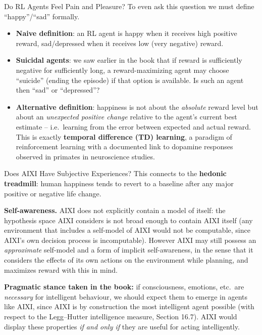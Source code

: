 \documentclass[aspectratio=169,10pt]{beamer}
\begin{document}
\begin{frame}{Do RL Agents Feel Pain and Pleasure?}
  To even ask this question we must define ``happy''/``sad'' formally.
  \begin{itemize}
    \item \textbf{Naive definition}: an RL agent is happy when it receives
      high positive reward, sad/depressed when it receives low
      (very negative) reward.
    \item \textbf{Suicidal agents}: we saw earlier in the book that if
      reward is sufficiently negative for sufficiently long, a
      reward-maximizing agent may choose ``suicide'' (ending the episode)
      if that option is available. Is such an agent then ``sad'' or
      ``depressed''?
    \item \textbf{Alternative definition}: happiness is not about the
      \emph{absolute} reward level but about an \emph{unexpected positive
      change} relative to the agent's current best estimate -- i.e.\
      learning from the error between expected and actual reward. This is
      exactly \textbf{temporal difference (TD) learning}, a paradigm of
      reinforcement learning with a documented link to dopamine responses
      observed in primates in neuroscience studies.
  \end{itemize}
\end{frame}

\begin{frame}{Does AIXI Have Subjective Experiences?}
  This connects to the \textbf{hedonic treadmill}: human happiness tends to
  revert to a baseline after any major positive or negative life change.

  \vspace{0.3em}
  \textbf{Self-awareness.} AIXI does not explicitly contain a model of
  itself: the hypothesis space AIXI considers is not broad enough to
  contain AIXI itself (any environment that includes a self-model of AIXI
  would not be computable, since AIXI's own decision process is
  incomputable). However AIXI may still possess an \emph{approximate}
  self-model and a form of implicit self-awareness, in the sense that it
  considers the effects of its own actions on the environment while
  planning, and maximizes reward with this in mind.

  \vspace{0.3em}
  \textbf{Pragmatic stance taken in the book:} if consciousness, emotions,
  etc.\ are \emph{necessary} for intelligent behaviour, we should expect
  them to emerge in agents like AIXI, since AIXI is by construction the
  most intelligent agent possible (with respect to the Legg--Hutter
  intelligence measure, Section 16.7). AIXI would display these properties
  \emph{if and only if} they are useful for acting intelligently.
\end{frame}
\end{document}
